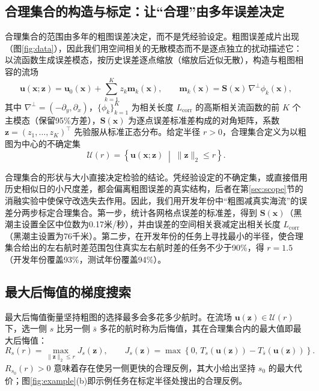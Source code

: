 \subsection{合理集合的构造与标定：让“合理”由多年误差决定}
\label{sec:calib}
合理集合的范围由多年的粗图误差决定，而不是凭经验设定。粗图误差成片出现（图\ref{fig:data}），因此我们用空间相关的无散模态而不是逐点独立的扰动描述它：以流函数生成误差模态，按历史误差逐点缩放（缩放后近似无散），构造与粗图相容的流场
\begin{equation}
\boldsymbol{u}(\boldsymbol{x}; \boldsymbol{z}) = \boldsymbol{u}_0(\boldsymbol{x}) + \sum_{k=1}^{K} z_k \boldsymbol{m}_k(\boldsymbol{x}), \qquad \boldsymbol{m}_k(\boldsymbol{x}) = \mathbf{S}(\boldsymbol{x})\, \nabla^{\perp}\phi_k(\boldsymbol{x}),
\label{eq:plausible_field}
\end{equation}
其中 $\nabla^{\perp} = (-\partial_y, \partial_x)$，$\{\phi_k\}_{k=1}^{K}$ 为相关长度 $L_{\text{corr}}$ 的高斯相关流函数的前 $K$ 个主模态（保留95\%方差），$\mathbf{S}(\boldsymbol{x})$ 为逐点误差标准差构成的对角矩阵，系数 $\boldsymbol{z} = (z_1, \dots, z_K)^{\top}$ 先验服从标准正态分布。给定半径 $r > 0$，合理集合定义为以粗图为中心的不确定集
\begin{equation}
\mathcal{U}(r) = \left\{ \boldsymbol{u}(\boldsymbol{x}; \boldsymbol{z}) \;\middle|\; \|\boldsymbol{z}\|_2 \le r \right\}.
\label{eq:plausible_set}
\end{equation}

合理集合的形状与大小直接决定检验的结论。凭经验设定的不确定集，或直接借用历史相似日的小尺度差，都会偏离粗图误差的真实结构，后者在第\ref{sec:scope}节的消融实验中使保守改选失去作用。因此，我们用开发年份中“粗图减真实海流”的误差分两步标定合理集合。第一步，统计各网格点误差的标准差，得到 $\mathbf{S}(\boldsymbol{x})$（黑潮主设置全区中位数为0.17米/秒），并由误差的空间相关衰减定出相关长度 $L_{\text{corr}}$（黑潮主设置为76千米）。第二步，在开发年份的任务上寻找最小的半径，使合理集合给出的左右航时差范围包住真实左右航时差的任务不少于90\%，得 $r = 1.5$（开发年份覆盖93\%，测试年份覆盖94\%）。

\subsection{最大后悔值的梯度搜索}
\label{sec:search}
最大后悔值衡量坚持粗图的选择最多会多花多少航时。在流场 $\boldsymbol{u}(\boldsymbol{z}) \in \mathcal{U}(r)$ 下，选一侧 $s$ 比另一侧 $\bar{s}$ 多花的航时称为后悔值，其在合理集合内的最大值即最大后悔值：
\begin{equation}
R_s(r) = \max_{\|\boldsymbol{z}\|_2 \le r} J_s(\boldsymbol{z}), \qquad J_s(\boldsymbol{z}) = \max\left\{ 0,\, T_s(\boldsymbol{u}(\boldsymbol{z})) - T_{\bar{s}}(\boldsymbol{u}(\boldsymbol{z})) \right\}.
\label{eq:worst_regret}
\end{equation}
$R_{s_0}(r) > 0$ 意味着存在使另一侧更快的合理反例，其大小给出坚持 $s_0$ 的最大代价；图\ref{fig:example}(b)即示例任务在标定半径处搜出的合理反例。

